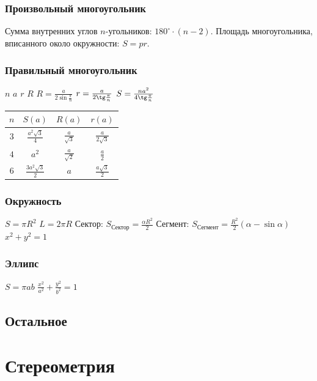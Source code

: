\subsubsection{Произвольный многоугольник}
Сумма внутренних углов $n$-угольников: $ 180^{\circ}\cdot (n-2) $.
Площадь многоугольника, вписанного около окружности: $S = p r$.
\subsubsection{Правильный многоугольник}
$n$
$a$
$r$
$R$
$ R = \frac{a}{2\sin\frac{\pi}{n}} $
$ r = \frac{a}{2\tg\frac{\pi}{n}} $
$ S =  \frac{n a^2}{4\tg\frac{\pi}{n}} $
\begin{tabu}[t]{||c||c||c|c||}
	\hline
		$ n $ & $ S(a) $ & $ R(a) $ & $ r(a) $ \\
	\hline
	\hline
		$ 3 $ & $ \frac{a^2 \sqrt{3}}{4} $ & $ \frac{a}{\sqrt{3}} $ & $ \frac{a}{2 \sqrt{3}} $ \\
	\hline
		$ 4 $ & $ a^2 $ & $ \frac{a}{\sqrt{2}} $ & $ \frac{a}{2} $ \\
	\hline
		$ 6 $ & $ \frac{3 a^2 \sqrt{3}}{2} $ & $ a $ & $ \frac{a \sqrt{3}}{2} $ \\
	\hline
\end{tabu}
\subsubsection{Окружность}
$ S = \pi R^2 $
$ L = 2 \pi R $
Сектор:
$ S_{\text{Сектор}} = \frac{\alpha R^2}{2} $
Сегмент:
$ S_{\text{Сегмент}} = \frac{R^2}{2} (\alpha - \sin \alpha) $
$ x^2 + y^2 = 1 $
\subsubsection{Эллипс}
$ S = \pi a b $
$ \frac{x^2}{a^2} + \frac{y^2}{b^2} = 1 $
\subsection{Остальное}
\section{Стереометрия}

